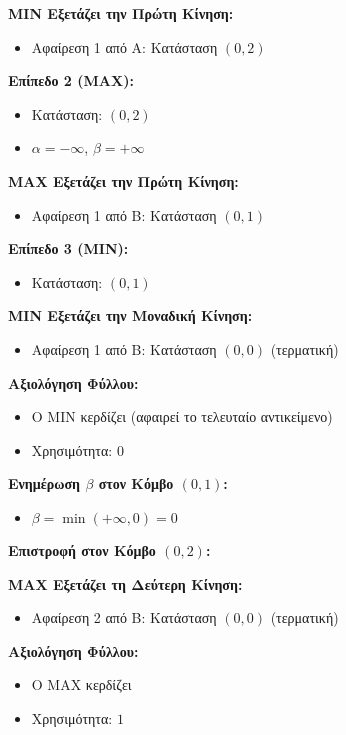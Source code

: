 \documentclass{article}
\begin{document}
\textbf{MIN Εξετάζει την Πρώτη Κίνηση:}
\begin{itemize}
    \item Αφαίρεση 1 από A: Κατάσταση $(0, 2)$
\end{itemize}

\textbf{Επίπεδο 2 (MAX):}
\begin{itemize}
    \item Κατάσταση: $(0, 2)$
    \item \(\alpha = -\infty\), \(\beta = +\infty\)
\end{itemize}

\textbf{MAX Εξετάζει την Πρώτη Κίνηση:}
\begin{itemize}
    \item Αφαίρεση 1 από B: Κατάσταση $(0, 1)$
\end{itemize}

\textbf{Επίπεδο 3 (MIN):}
\begin{itemize}
    \item Κατάσταση: $(0, 1)$
\end{itemize}

\textbf{MIN Εξετάζει την Μοναδική Κίνηση:}
\begin{itemize}
    \item Αφαίρεση 1 από B: Κατάσταση $(0, 0)$ (τερματική)
\end{itemize}

\textbf{Αξιολόγηση Φύλλου:}
\begin{itemize}
    \item Ο MIN κερδίζει (αφαιρεί το τελευταίο αντικείμενο)
    \item Χρησιμότητα: \(0\)
\end{itemize}

\textbf{Ενημέρωση \(\beta\) στον Κόμβο $(0, 1)$:}
\begin{itemize}
    \item \(\beta = \min(+\infty, 0) = 0\)
\end{itemize}

\textbf{Επιστροφή στον Κόμβο $(0, 2)$:}

\textbf{MAX Εξετάζει τη Δεύτερη Κίνηση:}
\begin{itemize}
    \item Αφαίρεση 2 από B: Κατάσταση $(0, 0)$ (τερματική)
\end{itemize}

\textbf{Αξιολόγηση Φύλλου:}
\begin{itemize}
    \item Ο MAX κερδίζει
    \item Χρησιμότητα: \(1\)
\end{itemize}
\end{document}
